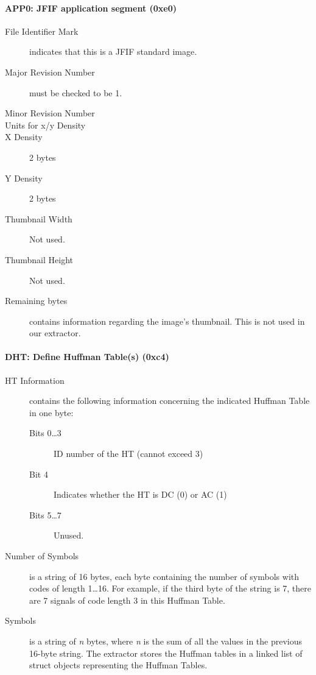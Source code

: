 \paragraph*{APP0: JFIF application segment (0xe0)}
\begin{description}
	\item[File Identifier Mark] indicates that this is a JFIF standard image.
	\item[Major Revision Number] must be checked to be 1.
	\item[Minor Revision Number] 
	\item[Units for x/y Density] 
	\item[X Density]2 bytes
	\item[Y Density]2 bytes
	\item[Thumbnail Width] Not used.
	\item[Thumbnail Height] Not used.
	\item[Remaining bytes] contains information regarding the image's thumbnail. This is not used in our extractor.
\end{description}

\paragraph*{DHT: Define Huffman Table(s) (0xc4)}
\begin{description}
	\item[HT Information] contains the following information concerning the indicated Huffman Table in one byte:
		\begin{description}
			\item[Bits 0\ldots3] ID number of the HT (cannot exceed 3)
			\item[Bit 4] Indicates whether the HT is DC (0) or AC (1)
			\item[Bits 5\ldots7] Unused.
		\end{description}
	\item[Number of Symbols] is a string of 16 bytes, each byte containing the number of symbols with 
		codes of length 1\ldots16. For example, if the third byte of the string is 7, 
		there are 7 signals of code length 3 in this Huffman Table.
	\item[Symbols] is a string of \emph{n} bytes, where \emph{n} is 
		the sum of all the values in the previous 16-byte string. 
		The extractor stores the Huffman tables in a linked list of struct objects representing the Huffman Tables.
\end{description}

